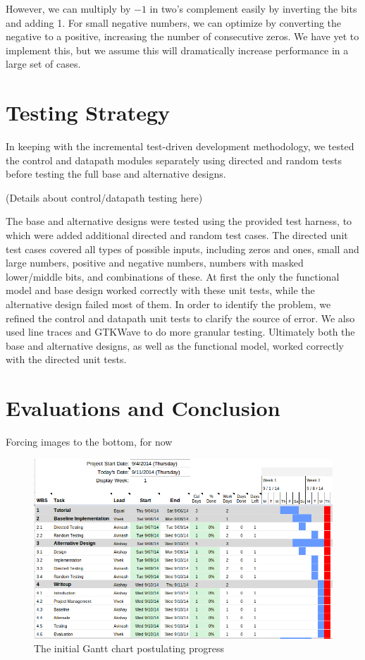 \documentclass[11pt]{article}
\begin{document}
However, we can multiply by $-1$ in two's complement easily by inverting the bits and adding 1. 
For small negative numbers, we can optimize by converting the negative to a positive, increasing the number of consecutive zeros.
We have yet to implement this, but we assume this will dramatically increase performance in a large set of cases. 


\section{Testing Strategy}

In keeping with the incremental test-driven development methodology, we tested the control and datapath modules separately using directed and random tests before testing the full base and alternative designs. 

(Details about control/datapath testing here)

The base and alternative designs were tested using the provided test harness, to which were added additional directed and random test cases.
The directed unit test cases covered all types of possible inputs, including zeros and ones,
small and large numbers, positive and negative numbers, numbers with masked lower/middle bits, and combinations of these.
At first the only the functional model and base design worked correctly with these unit tests, while the alternative design failed most of them.
In order to identify the problem, we refined the control and datapath unit tests to clarify the source of error.
We also used line traces and GTKWave to do more granular testing.
Ultimately both the base and alternative designs, as well as the functional model, worked correctly with the directed unit tests. 

\section{Evaluations and Conclusion}

Forcing images to the bottom, for now

\begin{figure}
\centering
\includegraphics[scale=0.5]{gantt}
\caption{The initial Gantt chart postulating progress}
\label{fig:gantt}
\end{figure}
\end{document}
